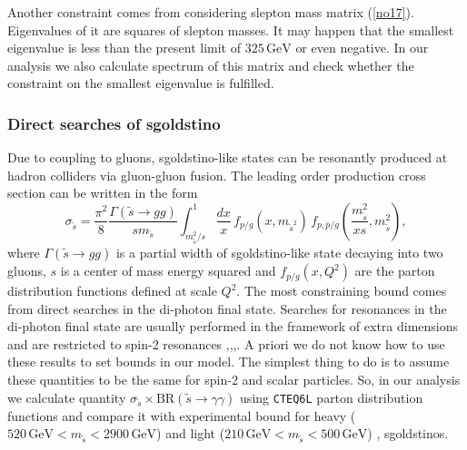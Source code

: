 \documentclass[10pt]{article}
\begin{document}
\noindent
Another constraint comes from considering slepton mass matrix (\ref{no17}). Eigenvalues of it are squares of slepton masses. It may happen that the smallest eigenvalue is less than the present limit of $325 \, \text{GeV}$ \cite{ATLAS_slepton} or even negative. In our analysis we also calculate spectrum of this matrix and check whether the constraint on the smallest eigenvalue is fulfilled.
\subsubsection{Direct searches of sgoldstino}
Due to coupling to gluons, sgoldstino-like states can be resonantly produced at hadron colliders via gluon-gluon fusion. The leading order production cross section can be written in the form \cite{Bellazzini}
\begin{equation}
\label{no27}
\sigma_{\tilde{s}} = \frac{\pi^2}{8} \frac{\Gamma(\tilde{s}\rightarrow gg)}{s m_{\tilde{s}}} \int_{m_{\tilde{s}}^2/s}^{1} \frac{dx}{x} \, f_{p/g}(x,m_{\tilde{s}^2}) \, f_{p,\bar{p}/g}\left(\frac{m_{\tilde{s}}^2}{xs},m_{\tilde{s}}^2\right),
\end{equation}
where $\Gamma(\tilde{s}\rightarrow gg)$ is a partial width of sgoldstino-like state decaying into two gluons, $s$ is a center of mass energy squared and $f_{p/g}(x,Q^2)$ are the parton distribution functions defined at scale $Q^2$. The most constraining bound comes from direct searches in the di-photon final state. Searches for resonances in the di-photon final state are usually performed in the framework of extra dimensions and are restricted to spin-2 resonances \cite{Bellazzini},\cite{ATLAS_dph_h},\cite{ATLAS_dph_l},\cite{CMS_dph}. A priori we do not know how to use these results to set bounds in our model. The simplest thing to do is to assume these quantities to be the same for spin-2 and scalar particles. So, in our analysis we calculate quantity $\sigma_{\tilde{s}} \times \text{BR}(\tilde{s} \rightarrow \gamma \gamma)$ using \texttt{CTEQ6L} parton distribution functions and compare it with experimental bound for heavy  ($520 \, \text{GeV} < m_{\tilde{s}} < 2900 \, \text{GeV}$) \cite{ATLAS_dph_h} and light ($210 \, \text{GeV} < m_{\tilde{s}} < 500 \, \text{GeV}$) \cite{ATLAS_dph_l},\cite{CMS_dph} sgoldstinos.
\end{document}
